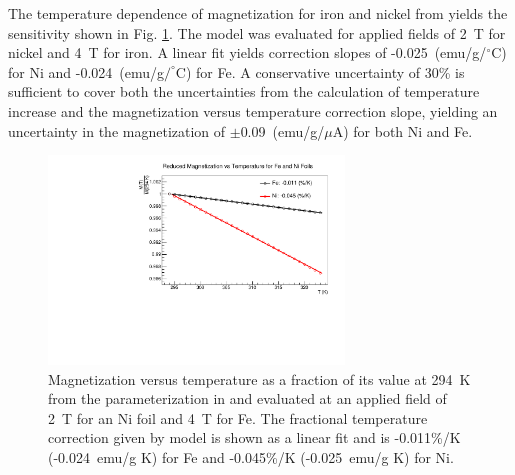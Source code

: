 \documentclass[preprint,12pt]{elsarticle}
\begin{document}
The temperature dependence of magnetization for iron and nickel from \cite{PauthenetMar1982,PauthenetNov1982} yields the sensitivity shown in Fig. \ref{fig:temperature_correction}. The model was evaluated for applied fields of 2~T for nickel and 4~T for iron. A linear fit yields correction slopes of -0.025~(emu/g/$^{\circ}$C) for Ni and  -0.024~(emu/g$/^{\circ}$C) for Fe. A conservative uncertainty of 30\% is sufficient to cover both the uncertainties from the calculation of temperature increase and the magnetization versus temperature correction slope, yielding an uncertainty in the magnetization of $\pm$0.09~({\rm emu/g}/$\mu$A) for both Ni and Fe. 
\begin{figure}[ht]
\centering
\includegraphics[width=0.7\textwidth]{target_heating_correction.pdf}
\caption{Magnetization versus temperature as a fraction of its value at 294~K from the parameterization in \cite{PauthenetMar1982,PauthenetNov1982} and evaluated at an applied field of 2~T for an Ni foil and 4~T for Fe. The fractional temperature correction given by model is shown as a linear fit and is -0.011\%/K (-0.024~emu/g K) for Fe and -0.045\%/K (-0.025~emu/g K) for Ni.}
\label{fig:temperature_correction}
\end{figure}
\end{document}
